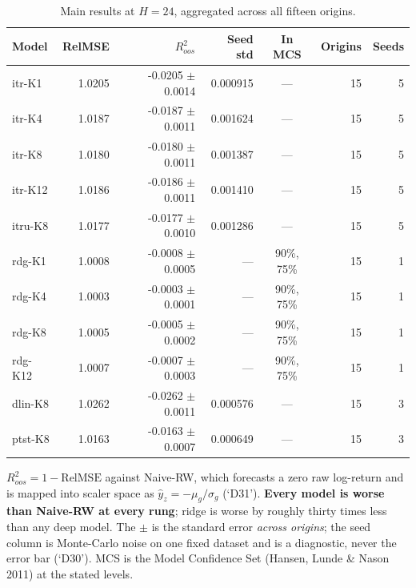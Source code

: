 \begin{table}[!t]
\centering
\caption{Main results at $H=24$, aggregated across all fifteen origins.}
\label{tab:main}
\begin{tabular}{lrrrcrr}
\toprule
Model & RelMSE & $R^2_{oos}$ & Seed std & In MCS & Origins & Seeds \\
\midrule
itr-K1 & 1.0205 & -0.0205 $\pm$ 0.0014 & 0.000915 & --- & 15 & 5 \\
itr-K4 & 1.0187 & -0.0187 $\pm$ 0.0011 & 0.001624 & --- & 15 & 5 \\
itr-K8 & 1.0180 & -0.0180 $\pm$ 0.0011 & 0.001387 & --- & 15 & 5 \\
itr-K12 & 1.0186 & -0.0186 $\pm$ 0.0011 & 0.001410 & --- & 15 & 5 \\
itru-K8 & 1.0177 & -0.0177 $\pm$ 0.0010 & 0.001286 & --- & 15 & 5 \\
rdg-K1 & 1.0008 & -0.0008 $\pm$ 0.0005 & --- & 90\%, 75\% & 15 & 1 \\
rdg-K4 & 1.0003 & -0.0003 $\pm$ 0.0001 & --- & 90\%, 75\% & 15 & 1 \\
rdg-K8 & 1.0005 & -0.0005 $\pm$ 0.0002 & --- & 90\%, 75\% & 15 & 1 \\
rdg-K12 & 1.0007 & -0.0007 $\pm$ 0.0003 & --- & 90\%, 75\% & 15 & 1 \\
dlin-K8 & 1.0262 & -0.0262 $\pm$ 0.0011 & 0.000576 & --- & 15 & 3 \\
ptst-K8 & 1.0163 & -0.0163 $\pm$ 0.0007 & 0.000649 & --- & 15 & 3 \\
\bottomrule
\end{tabular}
\vspace{2pt}\par\footnotesize $R^2_{oos} = 1 - \text{RelMSE}$ against Naive-RW, which forecasts a zero raw log-return and is mapped into scaler space as $\hat{y}_z = -\mu_g/\sigma_g$ (`D31'). \textbf{Every model is worse than Naive-RW at every rung}; ridge is worse by roughly thirty times less than any deep model. The $\pm$ is the standard error \emph{across origins}; the seed column is Monte-Carlo noise on one fixed dataset and is a diagnostic, never the error bar (`D30'). MCS is the Model Confidence Set (Hansen, Lunde \& Nason 2011) at the stated levels.
\end{table}
